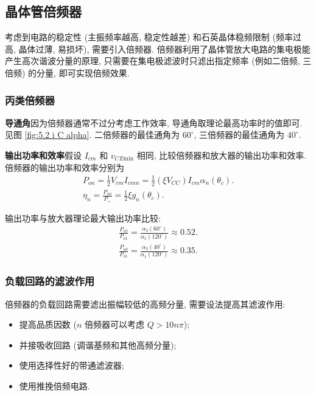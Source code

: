 \subsection{晶体管倍频器} \label{5 晶体管倍频器}
考虑到电路的稳定性 (主振频率越高, 稳定性越差) 和石英晶体稳频限制 (频率过高, 晶体过薄, 易损坏), 需要引入倍频器. 倍频器利用了晶体管放大电路的集电极能产生高次谐波分量的原理, 只需要在集电极滤波时只滤出指定频率 (例如二倍频, 三倍频) 的分量, 即可实现倍频效果.

\subsubsection{丙类倍频器} \label{5.4 丙类倍频器}
\textbf{导通角}\quad 因为倍频器通常不过分考虑工作效率, 导通角取理论最高功率时的值即可. 见图 \ref{fig:5.2 i C alpha}. 二倍频器的最佳通角为 $60^\circ$, 三倍频器的最佳通角为 $40^\circ$.

\textbf{输出功率和效率}\quad 假设 $I_{cm}$ 和 $v_{CE\mathrm{min}}$ 相同, 比较倍频器和放大器的输出功率和效率. 倍频器的输出功率和效率分别为
\begin{gather}
    P_{on}=\frac{1}{2}V_{cm}I_{cmn}=\frac{1}{2}(\xi V_{CC})I_{cm}\alpha_n(\theta_c). \\
    \eta_n=\frac{P_{on}}{P_=}=\frac{1}{2}\xi g_n(\theta_c).
\end{gather}

输出功率与放大器理论最大输出功率比较:
\begin{gather}
    \frac{P_{o2}}{P_{o1}}=\frac{\alpha_2(60^\circ)}{\alpha_1(120^\circ)}\approx 0.52. \\
    \frac{P_{o3}}{P_{o1}}=\frac{\alpha_3(40^\circ)}{\alpha_1(120^\circ)}\approx 0.35.
\end{gather}

\subsubsection{负载回路的滤波作用}
倍频器的负载回路需要滤出振幅较低的高频分量, 需要设法提高其滤波作用:
\begin{itemize}
    \item 提高品质因数 ($n$ 倍频器可以考虑 $Q>10n\pi$);
    \item 并接吸收回路 (调谐基频和其他高频分量);
    \item 使用选择性好的带通滤波器;
    \item 使用推挽倍频电路.
\end{itemize}
